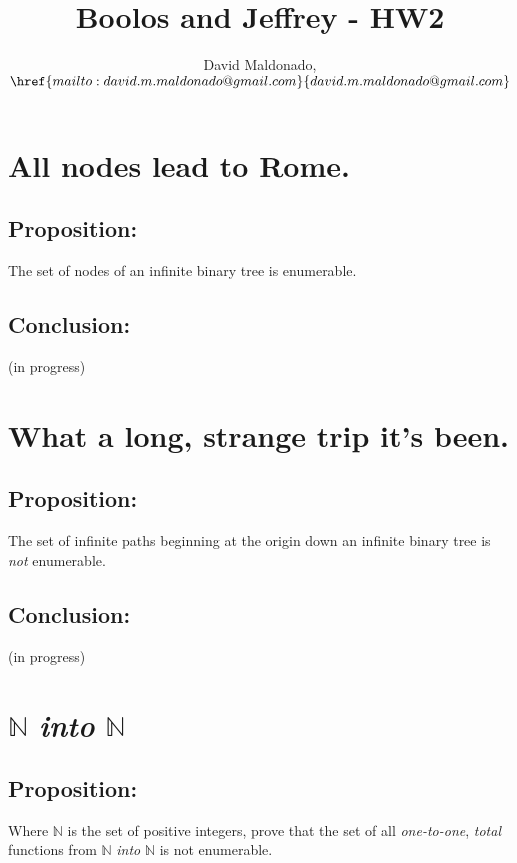 \documentclass[a4paper,11pt]{article}
\author{David Maldonado, $\href{mailto:david.m.maldonado@gmail.com}%
{david.m.maldonado@gmail.com}$}
\title{Boolos and Jeffrey - HW2}
\begin{document}
\maketitle

\bigskip


\section{All nodes lead to Rome.} 

	\subsection*{Proposition:}
	The set of nodes of an infinite binary tree is enumerable.
	
	\bigskip

	\subsection*{Conclusion:}
	(in progress)


\section{What a long, strange trip it's been.}

	\subsection*{Proposition:}
	The set of infinite paths beginning at the origin down an infinite binary tree is \textit{not} enumerable.

	\bigskip
	
	\subsection*{Conclusion:}
	(in progress)
	
\bigskip


\section{$\mathbb{N}$ \textit{into} $\mathbb{N}$}

	\subsection*{Proposition:}
	Where $\mathbb{N}$ is the set of positive integers, prove that the set of all \textit{one-to-one}, \textit{total}
	functions from $\mathbb{N}$ \textit{into} $\mathbb{N}$ is not enumerable.
	
\end{document}
